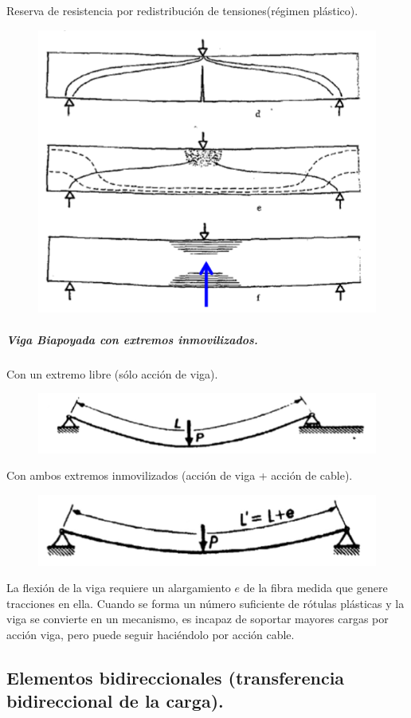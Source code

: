 Reserva de resistencia por redistribución de tensiones(régimen plástico).
\begin{figure}[H]
    \centering
    \includegraphics[width=0.75\linewidth]{Imagenes/Viga Biapoyada - resistencia.png}
\end{figure}

\subparagraph{Viga Biapoyada con extremos inmovilizados.}
Con un extremo libre (sólo acción de viga).
\begin{figure}[H]
    \centering
    \includegraphics[width=0.75\linewidth]{Imagenes/Viga biapoyada con un extremo inmobilizado.png}
\end{figure}
Con ambos extremos inmovilizados (acción de viga + acción de cable).
\begin{figure}[H]
    \centering
    \includegraphics[width=0.75\linewidth]{Imagenes/Viga biapoyada con ambos extremos inmovilizados.png}
\end{figure}
La flexión de la viga requiere un alargamiento $e$ de la fibra medida que genere tracciones en ella.
Cuando se forma un número suficiente de rótulas plásticas y la viga se convierte en un mecanismo, es incapaz de soportar mayores cargas por acción viga, pero puede seguir haciéndolo por acción cable.

\subsection{Elementos bidireccionales (transferencia bidireccional de la carga).}
